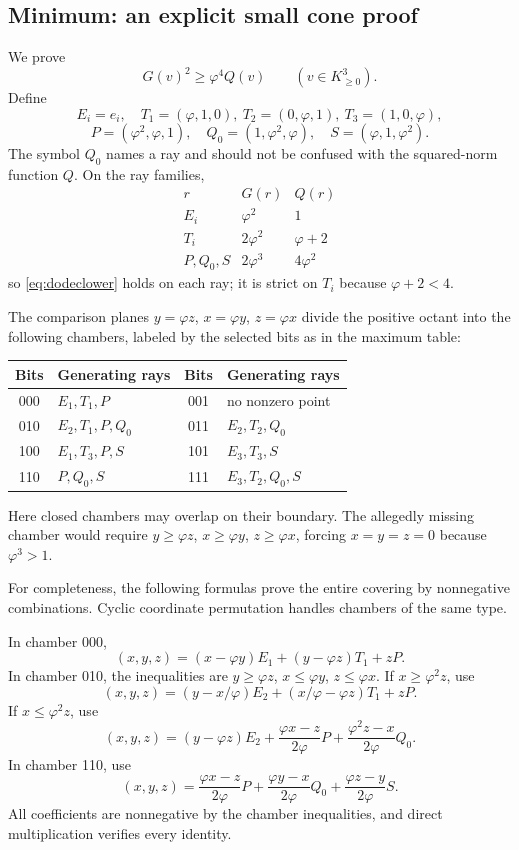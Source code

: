 \documentclass[11pt,a4paper]{article}
\newcommand{\ph}{\varphi}
\begin{document}
\subsection{Minimum: an explicit small cone proof}
We prove
\begin{equation}\label{eq:dodeclower}
 G(v)^2\ge\ph^4Q(v)\qquad(v\in K_{\ge0}^3).
\end{equation}
Define
\[
 E_i=e_i,\quad T_1=(\ph,1,0),\ T_2=(0,\ph,1),\ T_3=(1,0,\ph),
\]
\[
 P=(\ph^2,\ph,1),\quad Q_0=(1,\ph^2,\ph),\quad S=(\ph,1,\ph^2).
\]
The symbol $Q_0$ names a ray and should not be confused with the squared-norm function $Q$.
On the ray families,
\[
\begin{array}{c|cc}
 r&G(r)&Q(r)\\\hline
 E_i&\ph^2&1\\
 T_i&2\ph^2&\ph+2\\
 P,Q_0,S&2\ph^3&4\ph^2
\end{array}
\]
so \eqref{eq:dodeclower} holds on each ray; it is strict on $T_i$ because $\ph+2<4$.

The comparison planes $y=\ph z$, $x=\ph y$, $z=\ph x$ divide the positive octant into the following chambers, labeled by the selected bits as in the maximum table:
\begin{center}
\begin{tabular}{@{}clcl@{}}\toprule
Bits&Generating rays&Bits&Generating rays\\\midrule
000&$E_1,T_1,P$&001&no nonzero point\\
010&$E_2,T_1,P,Q_0$&011&$E_2,T_2,Q_0$\\
100&$E_1,T_3,P,S$&101&$E_3,T_3,S$\\
110&$P,Q_0,S$&111&$E_3,T_2,Q_0,S$\\\bottomrule
\end{tabular}
\end{center}
Here closed chambers may overlap on their boundary. The allegedly missing chamber would require $y\ge\ph z$, $x\ge\ph y$, $z\ge\ph x$, forcing $x=y=z=0$ because $\ph^3>1$.

For completeness, the following formulas prove the entire covering by nonnegative combinations. Cyclic coordinate permutation handles chambers of the same type.

In chamber 000,
\[
 (x,y,z)=(x-\ph y)E_1+(y-\ph z)T_1+zP.
\]
In chamber 010, the inequalities are $y\ge\ph z$, $x\le\ph y$, $z\le\ph x$. If $x\ge\ph^2z$, use
\[
 (x,y,z)=(y-x/\ph)E_2+(x/\ph-\ph z)T_1+zP.
\]
If $x\le\ph^2z$, use
\[
 (x,y,z)=(y-\ph z)E_2+\frac{\ph x-z}{2\ph}P
                   +\frac{\ph^2z-x}{2\ph}Q_0.
\]
In chamber 110, use
\[
 (x,y,z)=\frac{\ph x-z}{2\ph}P+\frac{\ph y-x}{2\ph}Q_0
                         +\frac{\ph z-y}{2\ph}S.
\]
All coefficients are nonnegative by the chamber inequalities, and direct multiplication verifies every identity.
\end{document}
